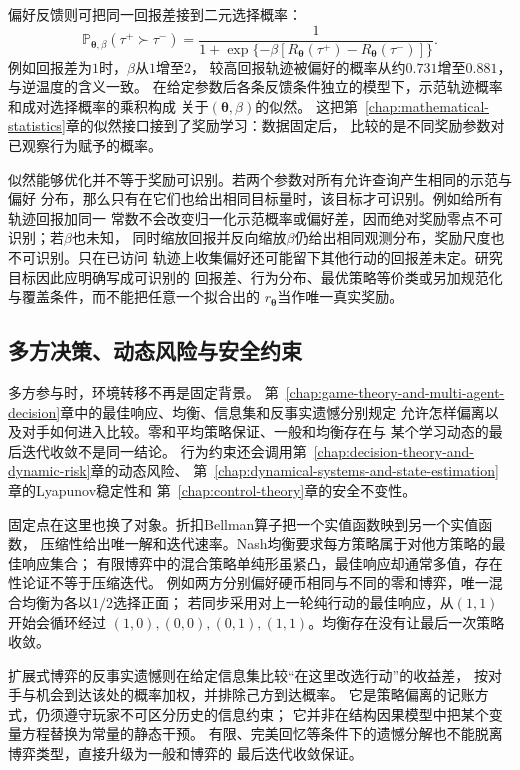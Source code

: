 偏好反馈则可把同一回报差接到二元选择概率：
\begin{equation}
  \mathbb{P}_{\bm\theta,\beta}
  (\tau^+\succ\tau^-)
  =
  \frac{1}{
    1+\exp\{-\beta[
      R_{\bm\theta}(\tau^+)-R_{\bm\theta}(\tau^-)
    ]\}
  }.
  \label{eq:future-reward-preference-likelihood}
\end{equation}
例如回报差为$1$时，$\beta$从$1$增至$2$，
较高回报轨迹被偏好的概率从约$0.731$增至$0.881$，与逆温度的含义一致。
在给定参数后各条反馈条件独立的模型下，示范轨迹概率和成对选择概率的乘积构成
关于\((\bm\theta,\beta)\)的似然。
这把第~\ref{chap:mathematical-statistics}章的似然接口接到了奖励学习：数据固定后，
比较的是不同奖励参数对已观察行为赋予的概率。

似然能够优化并不等于奖励可识别。若两个参数对所有允许查询产生相同的示范与偏好
分布，那么只有在它们也给出相同目标量时，该目标才可识别。例如给所有轨迹回报加同一
常数不会改变归一化示范概率或偏好差，因而绝对奖励零点不可识别；若\(\beta\)也未知，
同时缩放回报并反向缩放\(\beta\)仍给出相同观测分布，奖励尺度也不可识别。只在已访问
轨迹上收集偏好还可能留下其他行动的回报差未定。研究目标因此应明确写成可识别的
回报差、行为分布、最优策略等价类或另加规范化与覆盖条件，而不能把任意一个拟合出的
\(r_{\bm\theta}\)当作唯一真实奖励。

\subsection{多方决策、动态风险与安全约束}
\label{sec:future-tasks-participants-risk-safety}

多方参与时，环境转移不再是固定背景。
第~\ref{chap:game-theory-and-multi-agent-decision}章中的最佳响应、均衡、信息集和反事实遗憾分别规定
允许怎样偏离以及对手如何进入比较。零和平均策略保证、一般和均衡存在与
某个学习动态的最后迭代收敛不是同一结论。
行为约束还会调用第~\ref{chap:decision-theory-and-dynamic-risk}章的动态风险、
第~\ref{chap:dynamical-systems-and-state-estimation}章的Lyapunov稳定性和
第~\ref{chap:control-theory}章的安全不变性。

固定点在这里也换了对象。折扣Bellman算子把一个实值函数映到另一个实值函数，
压缩性给出唯一解和迭代速率。Nash均衡要求每方策略属于对他方策略的最佳响应集合；
有限博弈中的混合策略单纯形虽紧凸，最佳响应却通常多值，存在性论证不等于压缩迭代。
例如两方分别偏好硬币相同与不同的零和博弈，唯一混合均衡为各以$1/2$选择正面；
若同步采用对上一轮纯行动的最佳响应，从$(1,1)$开始会循环经过
$(1,0),(0,0),(0,1),(1,1)$。均衡存在没有让最后一次策略收敛。

扩展式博弈的反事实遗憾则在给定信息集比较“在这里改选行动”的收益差，
按对手与机会到达该处的概率加权，并排除己方到达概率。
它是策略偏离的记账方式，仍须遵守玩家不可区分历史的信息约束；
它并非在结构因果模型中把某个变量方程替换为常量的静态干预。
有限、完美回忆等条件下的遗憾分解也不能脱离博弈类型，直接升级为一般和博弈的
最后迭代收敛保证。

